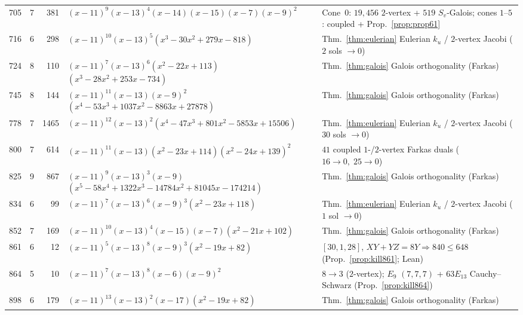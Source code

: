 \documentclass[11pt,reqno]{amsart}
\theoremstyle{definition}
\theoremstyle{remark}
\numberwithin{equation}{section}
\numberwithin{table}{section}
\begin{document}
{\begin{longtable}{@{}rrr>{\raggedright\arraybackslash}p{2.45in}>{\raggedright\arraybackslash}p{2.35in}@{}}
705 & 7 & 381 & $(x-11)^9$\allowbreak $(x-13)^4$\allowbreak $(x-14)$\allowbreak $(x-15)$\allowbreak $(x-7)$\allowbreak $(x-9)^2$ & Cone~$0$: $19{,}456$ $2$-vertex + $519$ $S_v$-Galois; cones $1$--$5$: coupled + Prop.~\ref{prop:prop61} \\
716 & 6 & 298 & $(x-11)^{10}$\allowbreak $(x-13)^5$\allowbreak $(x^3-30x^2+279x-818)$ & Thm.~\ref{thm:eulerian} Eulerian $k_u$ / $2$-vertex Jacobi ($2$ sols $\to 0$) \\
724 & 8 & 110 & $(x-11)^7$\allowbreak $(x-13)^6$\allowbreak $(x^2-22x+113)$\allowbreak $(x^3-28x^2+253x-734)$ & Thm.~\ref{thm:galois} Galois orthogonality (Farkas) \\
745 & 8 & 144 & $(x-11)^{11}$\allowbreak $(x-13)$\allowbreak $(x-9)^2$\allowbreak $(x^4-53x^3+1037x^2-8863x+27878)$ & Thm.~\ref{thm:galois} Galois orthogonality (Farkas) \\
778 & 7 & 1465 & $(x-11)^{12}$\allowbreak $(x-13)^2$\allowbreak $(x^4-47x^3+801x^2-5853x+15506)$ & Thm.~\ref{thm:eulerian} Eulerian $k_u$ / $2$-vertex Jacobi ($30$ sols $\to 0$) \\
800 & 7 & 614 & $(x-11)^{11}$\allowbreak $(x-13)$\allowbreak $(x^2-23x+114)$\allowbreak $(x^2-24x+139)^2$ & $41$ coupled $1$-/$2$-vertex Farkas duals ($16\to 0,\; 25\to 0$) \\
825 & 9 & 867 & $(x-11)^9$\allowbreak $(x-13)^3$\allowbreak $(x-9)$\allowbreak $(x^5-58x^4+1322x^3-14784x^2+81045x-174214)$ & Thm.~\ref{thm:galois} Galois orthogonality (Farkas) \\
834 & 6 & 99 & $(x-11)^7$\allowbreak $(x-13)^6$\allowbreak $(x-9)^3$\allowbreak $(x^2-23x+118)$ & Thm.~\ref{thm:eulerian} Eulerian $k_u$ / $2$-vertex Jacobi ($1$ sol $\to 0$) \\
852 & 7 & 169 & $(x-11)^{10}$\allowbreak $(x-13)^4$\allowbreak $(x-15)$\allowbreak $(x-7)$\allowbreak $(x^2-21x+102)$ & Thm.~\ref{thm:galois} Galois orthogonality (Farkas) \\
861 & 6 & 12 & $(x-11)^5$\allowbreak $(x-13)^8$\allowbreak $(x-9)^3$\allowbreak $(x^2-19x+82)$ & $[30,1,28]$, $XY+YZ=8Y \Rightarrow 840 \le 648$ (Prop.~\ref{prop:kill861}; Lean) \\
864 & 5 & 10 & $(x-11)^7$\allowbreak $(x-13)^8$\allowbreak $(x-6)$\allowbreak $(x-9)^2$ & $8\to 3$ ($2$-vertex); $E_9$ $(7,7,7)$ + $63E_{13}$ Cauchy--Schwarz (Prop.~\ref{prop:kill864}) \\
898 & 6 & 179 & $(x-11)^{13}$\allowbreak $(x-13)^2$\allowbreak $(x-17)$\allowbreak $(x^2-19x+82)$ & Thm.~\ref{thm:galois} Galois orthogonality (Farkas) \\

\end{longtable}}
\end{document}
